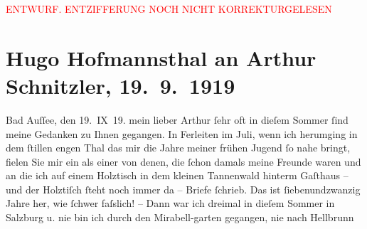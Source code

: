 
\begin{center}
            \textcolor{red}{ENTWURF. ENTZIFFERUNG NOCH NICHT KORREKTURGELESEN}
                      \end{center}
            
               \section[Hugo Hofmannsthal an Arthur Schnitzler, 19. 9. 1919]{ Hugo Hofmannsthal an Arthur Schnitzler, 19. 9. 1919}\nopagebreak{}\rehead{ }\begin{ledgroupsized}[t]{13cm}\normalsize\beginnumbering{} \toendnotes[C]{\smallbreak\pagebreak[2]} 
\toendnotes[C]{\smallbreak}\pstart
           {\pb}Bad Auſſee, den 19. IX 19.\pend
           \pstart{}mein lieber Arthur\pend\pstart
           ſehr oft in dieſem Sommer ſind meine Gedanken zu Ihnen gegangen. In Ferleiten im Juli, wenn ich herumging in dem
               ſtillen engen Thal das mir die Jahre meiner frühen Jugend ſo nahe bringt, fielen Sie
               mir ein als einer von denen, die ſchon damals meine Freunde waren und an die ich auf
               einem Holztisch in dem kleinen Tannenwald hinterm Gaſthaus – und der Holztiſch ſteht
               noch immer da – Briefe ſchrieb. Das ist ſiebenundzwanzig Jahre her, wie ſchwer
               faſslich! – Dann war ich dreimal in dieſem Sommer in Salzburg u. nie bin ich durch den Mirabell-garten gegangen, nie nach Hellbrunn

\end{ledgroupsized}
